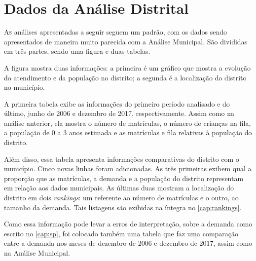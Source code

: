 \chapter{Dados da Análise Distrital}
\label{cap:apendDist}

\lettrine{A}{s} análises apresentadas a seguir seguem um padrão, com os dados sendo apresentados de maneira muito parecida com a Análise Municipal. São divididas em três partes, sendo uma figura e duas tabelas.

A figura mostra duas informações: a primeira é um gráfico que mostra a evolução do atendimento e da população no distrito; a segunda é a localização do distrito no município.

A primeira tabela exibe as informações do primeiro período analisado e do último, junho de 2006 e dezembro de 2017, respectivamente. Assim como na análise anterior, ela mostra o número de matrículas, o número de crianças na fila, a população de 0 a 3 anos estimada e as matrículas e fila relativas à população do distrito.

Além disso, essa tabela apresenta informações comparativas do distrito com o município. Cinco novas linhas foram adicionadas. As três primeiras exibem qual a proporção que as matrículas, a demanda e a população do distrito representam em relação aos dados municipais. As últimas duas mostram a localização do distrito em dois \textit{rankings}: um referente ao número de matrículas e o outro, ao tamanho da demanda. Tais listagens são exibidas na íntegra no \autoref{cap:rankings}.

Como essa informação pode levar a erros de interpretação, sobre a demanda como escrito no \autoref{cap:sp}, foi colocado também uma tabela que faz uma comparação entre a demanda nos meses de dezembro de 2006 e dezembro de 2017, assim como na Análise Municipal.